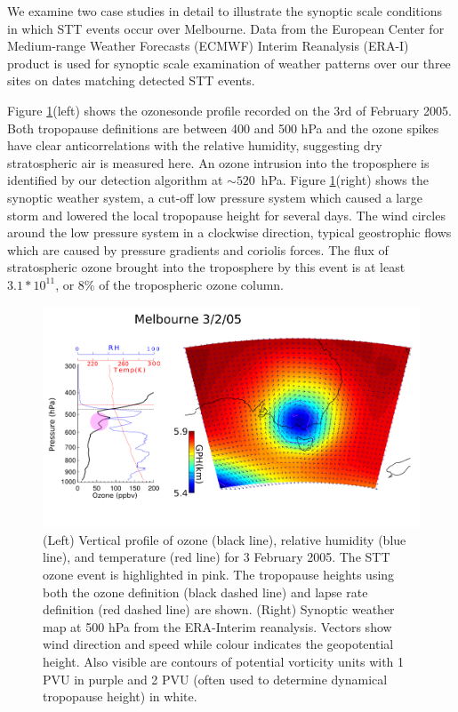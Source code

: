 \documentclass{article}
\begin{document}
  We examine two case studies in detail to illustrate the synoptic scale conditions in which STT events occur over Melbourne.
  Data from the European Center for Medium-range Weather Forecasts (ECMWF) Interim Reanalysis (ERA-I) \citep{Dee2011} product is used for synoptic scale examination of weather patterns over our three sites on dates matching detected STT events.
  
  Figure \ref{fig:Melbourne20050203}(left) shows the ozonesonde profile recorded on the 3rd of February 2005.
  Both tropopause definitions are between 400 and 500 hPa and the ozone spikes have clear anticorrelations with the relative humidity, suggesting dry stratospheric air is measured here. 
  An ozone intrusion into the troposphere is identified by our detection algorithm at $\sim520$~hPa.
  Figure \ref{fig:Melbourne20050203}(right) shows the synoptic weather system, a cut-off low pressure system which caused a large storm and lowered the local tropopause height for several days.
  The wind circles around the low pressure system in a clockwise direction, typical geostrophic flows which are caused by pressure gradients and coriolis forces.
  The flux of stratospheric ozone brought into the troposphere by this event is at least $3.1*10^{11}$, or 8\% of the tropospheric ozone column.

  \begin{figure}[!htbp]
    \begin{center}
    \includegraphics[width=1.0\columnwidth]{figures/Melbourne20050203.png}
    \caption{(Left) Vertical profile of ozone (black line), relative humidity (blue line), and temperature (red line) for  3 February 2005.
    The STT ozone event is highlighted in pink.
    The tropopause heights using both the ozone definition (black dashed line) and lapse rate definition (red dashed line) are shown.
    (Right) Synoptic weather map at 500 hPa from the ERA-Interim reanalysis.
    Vectors show wind direction and speed while colour indicates the geopotential height.
    Also visible are contours of potential vorticity units with 1 PVU in purple and 2 PVU (often used to determine dynamical tropopause height) in white.}
    \label{fig:Melbourne20050203}
    \end{center}
  \end{figure}
  
\end{document}
